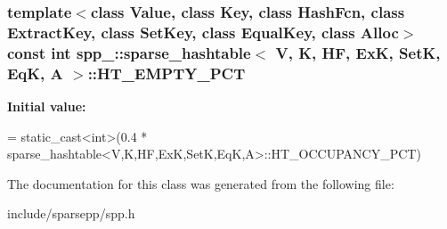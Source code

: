 \subsubsection[{\texorpdfstring{H\+T\+\_\+\+E\+M\+P\+T\+Y\+\_\+\+P\+CT}{HT_EMPTY_PCT}}]{\setlength{\rightskip}{0pt plus 5cm}template$<$class Value, class Key, class Hash\+Fcn, class Extract\+Key, class Set\+Key, class Equal\+Key, class Alloc$>$ const int {\bf spp\+\_\+\+::sparse\+\_\+hashtable}$<$ V, K, HF, ExK, SetK, EqK, A $>$\+::H\+T\+\_\+\+E\+M\+P\+T\+Y\+\_\+\+P\+CT\hspace{0.3cm}{\ttfamily [static]}}\hypertarget{classspp___1_1sparse__hashtable_a49f053c05fadf2da1767b4e6e48f6625}{}\label{classspp___1_1sparse__hashtable_a49f053c05fadf2da1767b4e6e48f6625}
{\bfseries Initial value\+:}
\begin{DoxyCode}
= \textcolor{keyword}{static\_cast<}\textcolor{keywordtype}{int}\textcolor{keyword}{>}(0.4 *
                   sparse\_hashtable<V,K,HF,ExK,SetK,EqK,A>::HT\_OCCUPANCY\_PCT)
\end{DoxyCode}


The documentation for this class was generated from the following file\+:\begin{DoxyCompactItemize}
\item 
include/sparsepp/spp.\+h\end{DoxyCompactItemize}
